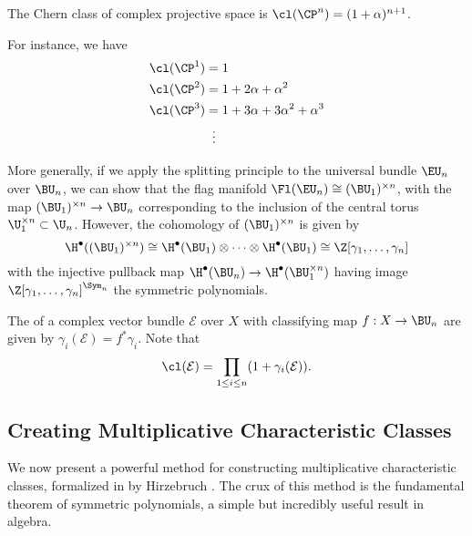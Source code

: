 \begin{corollary}
	The Chern class of complex projective space is $\cl(\CP^n)=(1+\alpha)^{n+1}$.
\end{corollary}
\begin{example}
	For instance, we have
	\[
		\begin{aligned}
			\cl(\CP^1) & = 1                              \\
			\cl(\CP^2) & = 1+2\alpha+\alpha^2             \\
			\cl(\CP^3) & = 1+3\alpha + 3\alpha^2+\alpha^3 \\
			           & \;\;\vdots
		\end{aligned}
	\]
\end{example}

More generally, if we apply the splitting principle to the universal bundle $\EU_n$ over $\BU_n$, we can show that the flag manifold $\Fl(\EU_n)\cong (\BU_1)^{\times n}$, with the map $(\BU_1)^{\times n} \to \BU_n$ corresponding to the inclusion of the central torus $\U_1^{\times n}\subset \U_n$. However, the cohomology of $(\BU_1)^{\times n}$ is given by
\[
	\H^\bullet((\BU_1)^{\times n}) \cong \H^\bullet(\BU_1)\otimes\cdots\otimes \H^\bullet(\BU_1) \cong \Z[\gamma_1,\ldots,\gamma_n]
\]
with the injective pullback map $\H^\bullet(\BU_n) \to \H^\bullet(\BU_1^{\times n})$ having image $\Z[\gamma_1,\ldots, \gamma_n]^{\Sym_n}$ the symmetric polynomials.


\begin{definition}\label{def:chern-roots}
	The  of a complex vector bundle $\mathcal{E}$ over $X$ with classifying map $f : X \to \BU_n$ are given by $\gamma_i(\mathcal{E}) = f^*\gamma_i$. Note that
	\[ \cl(\mathcal{E}) = \prod_{1\leq i \leq n} (1+\gamma_i(\mathcal{E})). \]
\end{definition}

\subsection{Creating Multiplicative Characteristic Classes}

We now present a powerful method for constructing multiplicative characteristic classes, formalized in by Hirzebruch \cite{hirzebruch1966methods}.
The crux of this method is the fundamental theorem of symmetric polynomials, a simple but incredibly useful result in algebra.


